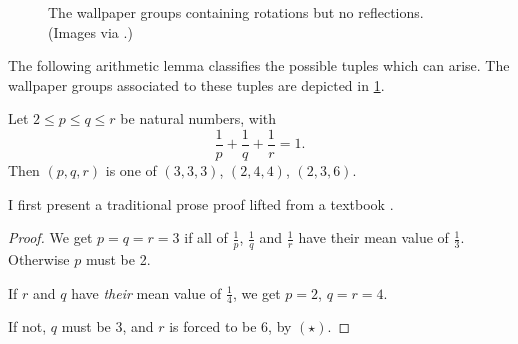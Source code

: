 \documentclass[12pt]{llncs}
\begin{document}
\begin{figure}[!htb]
  \centering
  \hfill
  \hfill
  \caption{The wallpaper groups containing
  rotations but no reflections. (Images via \cite{Eck}.)}
  \label{fig:wallpaper}
\end{figure} 

The following arithmetic lemma
classifies the possible tuples which can arise.
The wallpaper groups associated to these tuples are depicted in \cref{fig:wallpaper}.

\begin{lemma}
  Let $2\le p \le q \le r$ be natural numbers, with
  \begin{equation}
    \frac{1}{p}+\frac{1}{q}+\frac{1}{r}=1. \tag{$\star$}
  \end{equation}
  Then $(p, q, r)$ is one of $(3,3,3)$, $(2,4,4)$, $(2,3,6)$.
\end{lemma}


I first present a traditional prose proof
lifted from a textbook \cite{CBG08}.
\begin{proof}
  We get $p=q=r=3$ if all of $\frac{1}{p}$, $\frac{1}{q}$ and $\frac{1}{r}$ have their mean value
  of $\frac{1}{3}$.  Otherwise $p$ must be 2.

  If $r$ and $q$ have \emph{their} mean value of $\frac{1}{4}$, we get $p=2$, $q=r=4$.

  If not, $q$ must be 3, and $r$ is forced to be 6, by $(\star)$.
\end{proof}
\end{document}
